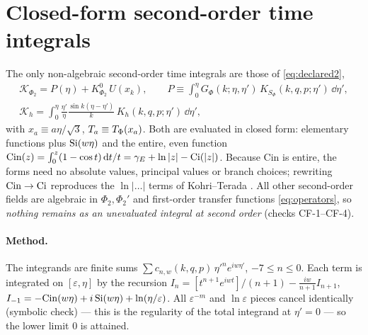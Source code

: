 \section{Closed-form second-order time integrals}
\label{app:closedforms}
{\small\begingroup\sloppy\allowdisplaybreaks
The only non-algebraic second-order time integrals are those of \eqref{eq:declared2},
\begin{gather*}
\mathcal K_{\Phi_2}=P(\eta)+K^0_{\Phi_2}\,U(x_k),\qquad P\equiv\int_0^\eta G_\Phi(k;\eta,\eta')\,K_{S_\Phi}(k,q,p;\eta')\,\dd\eta',\\
\mathcal K_h=\int_0^\eta\frac{\eta'}{\eta}\frac{\sin k(\eta-\eta')}{k}\,K_h(k,q,p;\eta')\,\dd\eta',
\end{gather*}
with $x_a\equiv a\eta/\sqrt3$, $T_a\equiv T_\Phi(x_a)$.  Both are evaluated in closed form: elementary functions plus $\operatorname{Si}(w\eta)$ and the entire,
even function $\mathrm{Cin}(z)=\int_0^z(1-\cos t)\,\mathrm d t/t=\gamma_E+\ln|z|-\operatorname{Ci}(|z|)$.  Because $\mathrm{Cin}$ is entire, the forms need no absolute
values, principal values or branch choices; rewriting $\mathrm{Cin}\to\operatorname{Ci}$ reproduces the $\ln|\ldots|$ terms of Kohri--Terada \cite{KT}.  All other
second-order fields are algebraic in $\Phi_2,\Phi_2'$ and first-order transfer functions \eqref{eq:operators}, so \emph{nothing remains as an
unevaluated integral at second order} (checks CF-1--CF-4).

\paragraph{Method.}  The integrands are finite sums $\sum c_{n,w}(k,q,p)\,{\eta'}^n e^{iw\eta'}$, $-7\le n\le0$.  Each term is integrated on
$[\varepsilon,\eta]$ by the recursion $I_n=[t^{n+1}e^{iwt}]/(n+1)-\frac{iw}{n+1}I_{n+1}$, $I_{-1}=-\mathrm{Cin}(w\eta)+i\operatorname{Si}(w\eta)+\ln(\eta/\varepsilon)$.
All $\varepsilon^{-m}$ and $\ln\varepsilon$ pieces cancel identically (symbolic check) --- this is the regularity of the total integrand at
$\eta'=0$ --- so the lower limit $0$ is attained.

}
